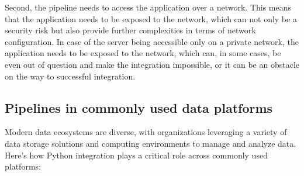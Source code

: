 Second, the pipeline needs to access the application over a network. This means that the application needs to be exposed to the network, which can not only be a security risk but also provide further complexities in terms of network configuration. In case of the server being accessible only on a private network, the application needs to be exposed to the network, which can, in some cases, be even out of question and make the integration impossible, or it can be an obstacle on the way to successful integration.

\subsection{Pipelines in commonly used data platforms}

Modern data ecosystems are diverse, with organizations leveraging a variety of data storage solutions and computing environments to manage and analyze data. Here’s how Python integration plays a critical role across commonly used platforms:

